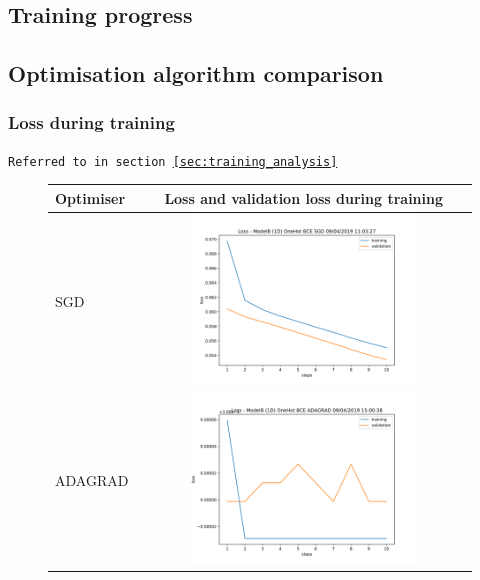 \begin{appendices}
    \newpage
    \section{Training progress}
        \subsection{Optimisation algorithm comparison}
        \subsubsection{Loss during training}
        \label{app:optimisation_loss_during_training}
        \texttt{Referred to in section \ref{sec:training_analysis}}
        
        \begin{figure}[H]
            \centering
            \begin{tabular}{l|c|}
                Optimiser & Loss and validation loss during training\\
                \hline
                SGD & \includegraphics[width=0.7\textwidth,height=0.22\textheight,keepaspectratio]{figures/training_plots/ModelB-(1D)-OneHot-BCE-SGD_09-04-2019_11-03-27_loss.pdf}\\
                \hline
                ADAGRAD & \includegraphics[width=0.7\textwidth,height=0.22\textheight,keepaspectratio]{figures/training_plots/ModelB-(1D)-OneHot-BCE-ADAGRAD_09-04-2019_15-00-38_loss.pdf}\\

\end{tabular}
\end{figure}
\end{appendices}
